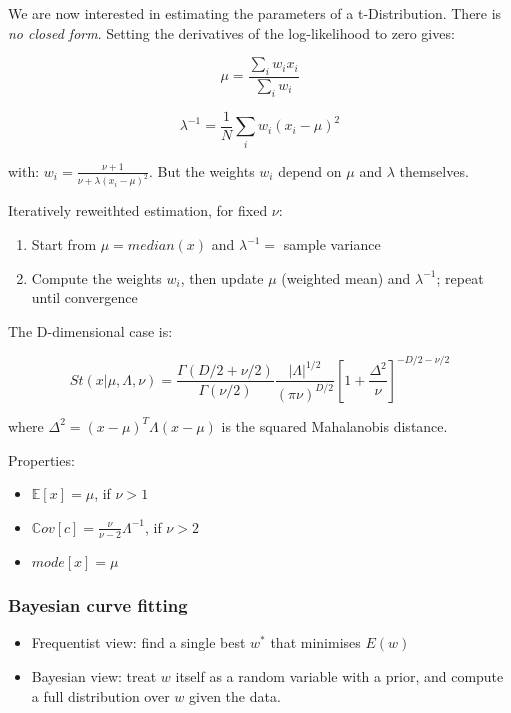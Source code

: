 \documentclass{article}
\begin{document}
We are now interested in estimating the parameters of a t-Distribution.
There is \emph{no closed form}. Setting the derivatives of the
log-likelihood to zero gives:

\[\mu = \frac{\sum_i w_i x_i}{\sum_i w_i}\]

\[\lambda^{-1} = \frac{1}{N} \sum_i w_i (x_i - \mu )^2\]

with: \(w_i = \frac{\nu + 1}{\nu + \lambda (x_i - \mu )^2}\). But the
weights \(w_i\) depend on \(\mu\) and \(\lambda\) themselves.

Iteratively reweithted estimation, for fixed \(\nu\):

\begin{enumerate}
\def\labelenumi{\arabic{enumi}.}
\item
  Start from \(\mu = median(x)\) and \(\lambda^{-1} =\) sample variance
\item
  Compute the weights \(w_i\), then update \(\mu\) (weighted mean) and
  \(\lambda^{-1}\); repeat until convergence
\end{enumerate}

The D-dimensional case is:

\[St(x | \mu, \Lambda , \nu) = \frac{\Gamma(D/2 + \nu / 2)}{\Gamma(\nu / 2)}
\frac{|\Lambda |^{1/2}}{(\pi \nu)^{D/2}} [1 + \frac{\Delta^2}{\nu}]^{-D/2 - \nu
/2}\]

where \(\Delta^2 = (x - \mu)^T \Lambda (x-\mu)\) is the squared
Mahalanobis distance.

Properties:

\begin{itemize}
\item
  \(\mathbb{E}[x] = \mu\), if \(\nu > 1\)
\item
  \(\mathbb{C}ov[c] = \frac{\nu}{\nu - 2} \Lambda^{-1}\), if \(\nu > 2\)
\item
  \(mode[x] = \mu\)
\end{itemize}

\subsubsection{Bayesian curve fitting}\label{bayesian-curve-fitting}

\begin{itemize}
\item
  Frequentist view: find a single best \(w^*\) that minimises \(E(w)\)
\item
  Bayesian view: treat \(w\) itself as a random variable with a prior,
  and compute a full distribution over \(w\) given the data.
\end{itemize}
\end{document}
